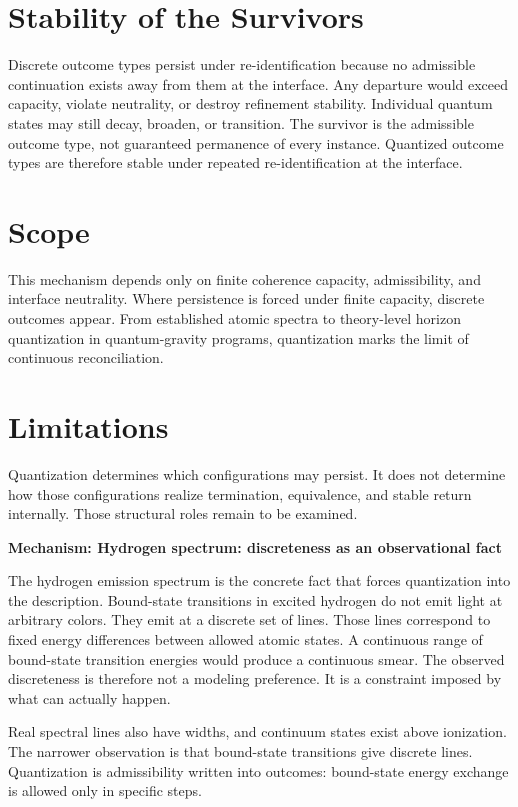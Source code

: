 \documentclass[11pt,twoside,openright]{book}
\newenvironment{mechanismbox}[1]
  {\begin{framed}\noindent\textbf{Mechanism: #1}\par\medskip}
  {\end{framed}}
\begin{document}
\section*{Stability of the Survivors}

Discrete outcome types persist under re-identification because no admissible continuation exists away from them at the interface. Any departure would exceed capacity, violate neutrality, or destroy refinement stability. Individual quantum states may still decay, broaden, or transition. The survivor is the admissible outcome type, not guaranteed permanence of every instance. Quantized outcome types are therefore stable under repeated re-identification at the interface.

\section*{Scope}

This mechanism depends only on finite coherence capacity, admissibility, and interface neutrality. Where persistence is forced under finite capacity, discrete outcomes appear. From established atomic spectra to theory-level horizon quantization in quantum-gravity programs, quantization marks the limit of continuous reconciliation.

\section*{Limitations}

Quantization determines which configurations may persist. It does not determine how those configurations realize termination, equivalence, and stable return internally. Those structural roles remain to be examined.

\begin{mechanismbox}{Hydrogen spectrum: discreteness as an observational fact}

The hydrogen emission spectrum is the concrete fact that forces quantization into the description. Bound-state transitions in excited hydrogen do not emit light at arbitrary colors. They emit at a discrete set of lines. Those lines correspond to fixed energy differences between allowed atomic states. A continuous range of bound-state transition energies would produce a continuous smear. The observed discreteness is therefore not a modeling preference. It is a constraint imposed by what can actually happen.

Real spectral lines also have widths, and continuum states exist above ionization. The narrower observation is that bound-state transitions give discrete lines. Quantization is admissibility written into outcomes: bound-state energy exchange is allowed only in specific steps.

\end{mechanismbox}
\end{document}
